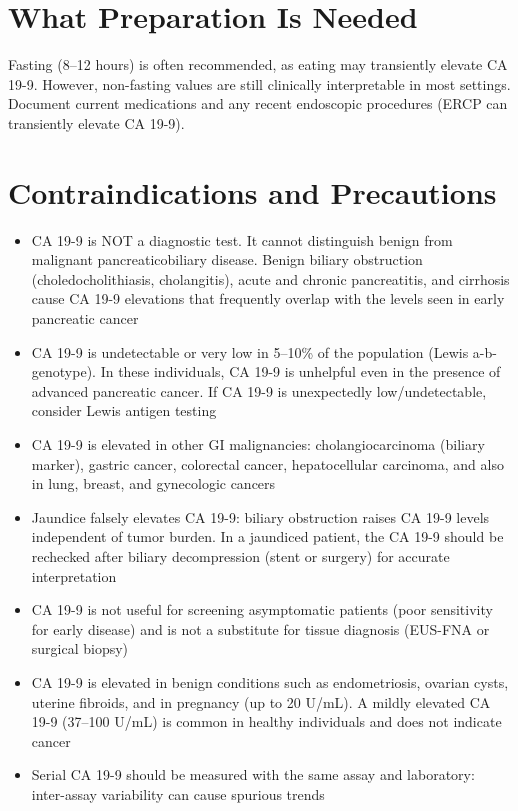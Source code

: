 \section*{What Preparation Is Needed}
Fasting (8--12 hours) is often recommended, as eating may transiently elevate CA 19-9. However, non-fasting values are still clinically interpretable in most settings. Document current medications and any recent endoscopic procedures (ERCP can transiently elevate CA 19-9).

\section*{Contraindications and Precautions}
\begin{itemize}
  \item CA 19-9 is NOT a diagnostic test. It cannot distinguish benign from malignant pancreaticobiliary disease. Benign biliary obstruction (choledocholithiasis, cholangitis), acute and chronic pancreatitis, and cirrhosis cause CA 19-9 elevations that frequently overlap with the levels seen in early pancreatic cancer
  \item CA 19-9 is undetectable or very low in 5--10\% of the population (Lewis a-b- genotype). In these individuals, CA 19-9 is unhelpful even in the presence of advanced pancreatic cancer. If CA 19-9 is unexpectedly low/undetectable, consider Lewis antigen testing
  \item CA 19-9 is elevated in other GI malignancies: cholangiocarcinoma (biliary marker), gastric cancer, colorectal cancer, hepatocellular carcinoma, and also in lung, breast, and gynecologic cancers
  \item Jaundice falsely elevates CA 19-9: biliary obstruction raises CA 19-9 levels independent of tumor burden. In a jaundiced patient, the CA 19-9 should be rechecked after biliary decompression (stent or surgery) for accurate interpretation
  \item CA 19-9 is not useful for screening asymptomatic patients (poor sensitivity for early disease) and is not a substitute for tissue diagnosis (EUS-FNA or surgical biopsy)
  \item CA 19-9 is elevated in benign conditions such as endometriosis, ovarian cysts, uterine fibroids, and in pregnancy (up to 20 U/mL). A mildly elevated CA 19-9 (37--100 U/mL) is common in healthy individuals and does not indicate cancer
  \item Serial CA 19-9 should be measured with the same assay and laboratory: inter-assay variability can cause spurious trends
\end{itemize}
